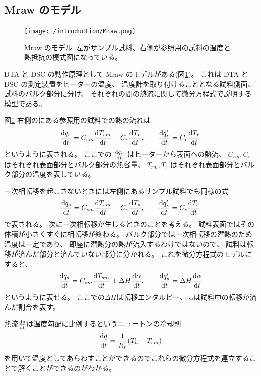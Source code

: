 \documentclass[9pt,dvipdfmx,a4paper]{jsarticle}
\begin{document}
\subsection{Mraw のモデル}
\begin{figure}
    \centering
    \texttt{[image: /introduction/Mraw.png]}
    \caption{Mraw のモデル\cite{Mraw}.
    左がサンプル試料、右側が参照用の試料の温度と熱抵抗の模式図になっている。}
    \label{fig:Mraw}
\end{figure}
DTA と DSC の動作原理として Mraw のモデル\cite{Mraw}がある(図\ref{fig:Mraw})。
これは DTA と DSC の測定装置をヒーターの温度、
温度計を取り付けることとなる試料側面、
試料のバルク部分に分け、
それぞれの間の熱流に関して微分方程式で説明する模型である。

図\ref{fig:Mraw} 右側のにある参照用の試料での熱の流れは
\begin{align}
    \dv{q_r}{t} = C_{rm}\dv{T_{rm}}{t}+C_r\dv{T_r}{t},\qquad
    \dv{q_r'}{t} = C_r \dv{T_r}{t}
\end{align}
というように表される。
ここでの \(\dv{q_r}{t}\) はヒーターから表面への熱流、
\(C_{rm}, C_{r}\) はそれぞれ表面部分とバルク部分の熱容量、
\(T_{rm}, T_{r}\) はそれぞれ表面部分とバルク部分の温度を表している。

一次相転移を起こさないときには左側にあるサンプル試料でも同様の式
\begin{align}
    \dv{q_s}{t} = C_{sm}\dv{T_{sm}}{t}+C_r\dv{T_s}{t}, \qquad
    \dv{q_s'}{t} = C_s \dv{T_s}{t}
\end{align}
で表される。
次に一次相転移が生じるときのことを考える。
試料表面ではその体積が小さくすぐに相転移が終わる。
バルク部分では一次相転移の潜熱のため温度は一定であり、
即座に潜熱分の熱が流入するわけではないので、
試料は転移が済んだ部分と済んでいない部分に分かれる。
これを微分方程式のモデルにすると、
\begin{align}
    \dv{q_s}{t} = C_{sm}\dv{T_{sm}}{t}+\Delta H\dv{\alpha}{t}, \qquad
    \dv{q_s'}{t} = \Delta H\dv{\alpha}{t}
\end{align}
というように表せる。
ここでの\(\Delta H\)は転移エンタルピー、
\(\alpha\)は試料中の転移が済んだ割合を表す。

熱流\(\dv{q}{t}\)は温度勾配に比例するというニュートンの冷却則
\begin{align}
    \dv{q}{t} = \frac{1}{R_r}(T_h-T_{rm})
\end{align}
を用いて温度としてあらわすことができるのでこれらの微分方程式を連立することで解くことができるのがわかる。
\end{document}
